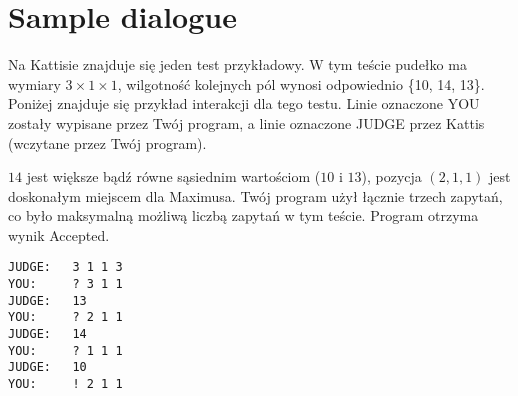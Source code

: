 \section*{Sample dialogue}
Na Kattisie znajduje się jeden test przykładowy.
W tym teście pudełko ma wymiary $3\times 1\times 1$, wilgotność kolejnych pól wynosi odpowiednio \{10, 14, 13\}.
Poniżej znajduje się przykład interakcji dla tego testu. Linie oznaczone YOU zostały wypisane przez Twój program,
a linie oznaczone JUDGE przez Kattis (wczytane przez Twój program).

$14$ jest większe bądź równe sąsiednim wartościom ($10$ i $13$), pozycja $(2,1,1)$ jest doskonałym miejscem dla Maximusa.
Twój program użył łącznie trzech zapytań, co było maksymalną możliwą liczbą zapytań w tym teście.
Program otrzyma wynik Accepted.

\begin{verbatim}
JUDGE:   3 1 1 3
YOU:     ? 3 1 1
JUDGE:   13
YOU:     ? 2 1 1
JUDGE:   14
YOU:     ? 1 1 1
JUDGE:   10
YOU:     ! 2 1 1
\end{verbatim}
